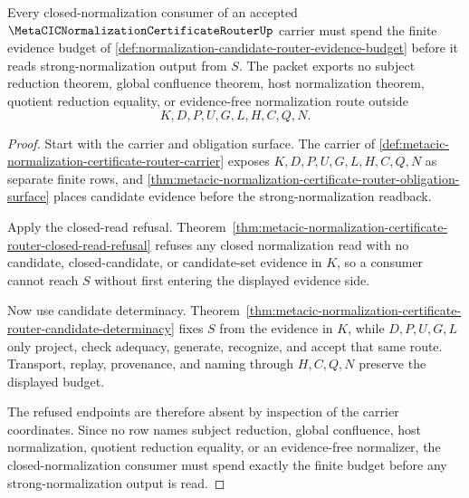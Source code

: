 \begin{theorem}
\label{thm:normalization-candidate-router-evidence-budget-nonescape}
Every closed-normalization consumer of an accepted $\MetaCICNormalizationCertificateRouterUp$ carrier must spend the finite evidence budget of \autoref{def:normalization-candidate-router-evidence-budget} before it reads strong-normalization output from $S$. The packet exports no subject reduction theorem, global confluence theorem, host normalization theorem, quotient reduction equality, or evidence-free normalization route outside
$$
K,D,P,U,G,L,H,C,Q,N.
$$
\end{theorem}
\begin{proof}
Start with the carrier and obligation surface. The carrier of \autoref{def:metacic-normalization-certificate-router-carrier} exposes $K,D,P,U,G,L,H,C,Q,N$ as separate finite rows, and \autoref{thm:metacic-normalization-certificate-router-obligation-surface} places candidate evidence before the strong-normalization readback.

Apply the closed-read refusal. Theorem~\ref{thm:metacic-normalization-certificate-router-closed-read-refusal} refuses any closed normalization read with no candidate, closed-candidate, or candidate-set evidence in $K$, so a consumer cannot reach $S$ without first entering the displayed evidence side.

Now use candidate determinacy. Theorem~\ref{thm:metacic-normalization-certificate-router-candidate-determinacy} fixes $S$ from the evidence in $K$, while $D,P,U,G,L$ only project, check adequacy, generate, recognize, and accept that same route. Transport, replay, provenance, and naming through $H,C,Q,N$ preserve the displayed budget.

The refused endpoints are therefore absent by inspection of the carrier coordinates. Since no row names subject reduction, global confluence, host normalization, quotient reduction equality, or an evidence-free normalizer, the closed-normalization consumer must spend exactly the finite budget before any strong-normalization output is read.
\end{proof}

